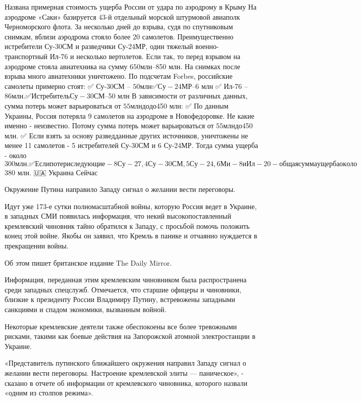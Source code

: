  
 
 
 
 

Названа примерная стоимость ущерба России от удара по аэродрому в Крыму
На аэродроме «Саки» базируется 43-й отдельный морской штурмовой авиаполк Черноморского флота. За несколько дней до взрыва, судя по спутниковым снимкам, вблизи аэродрома стояло более 20 самолетов. Преимущественно истребители Су-30СМ и разведчики Су-24МР, один тяжелый военно-транспортный Ил-76 и несколько вертолетов. Если так, то перед взрывом на аэродроме стояла авиатехника на сумму $650 млн – $850 млн.
На снимках после взрыва много авиатехники уничтожено. По подсчетам Forbes, российские самолеты примерно стоят:
✅ Су-30СМ – $50 млн
✅ Су-24МР – $6 млн
✅ Ил-76 – $86 млн.
✅ Истребитель Су-30СМ – $50 млн
В зависимости от различных данных, сумма потерь может варьироваться от $55 млн до до $450 млн:
✅ По данным Украины, Россия потеряла 9 самолетов на аэродроме в Новофедоровке. Не какие именно - неизвестно. Потому сумма потерь может варьироваться от $55 млн до $450 млн.
✅ Если взять за основу разведданные других источников, уничтожены не менее 11 самолетов - 5 истребителей Су-30СМ и 6 Су-24МР. Тогда сумма ущерба - около $300 млн.
✅ Если потери следующие - 8 Су-27, 4 Су-30СМ, 5 Су-24, 6 Ми-8 и Ил-20 - общая сумма ущерба около $380 млн.
🇺🇦 Украина Сейчас


Окружение Путина направило Западу сигнал о желании вести переговоры.

Идут уже 173-е сутки полномасштабной войны, которую Россия ведет в Украине, в западных СМИ появилась информация, что некий высокопоставленный кремлевский чиновник тайно обратился к Западу, с просьбой помочь положить конец этой войне. Якобы он заявил, что Кремль в панике и отчаянно нуждается в прекращении войны.

Об этом пишет британское издание The Daily Mirror.

Информация, переданная этим кремлевским чиновником была распространена среди западных спецслужб. Отмечается, что старшие офицеры и чиновники, близкие к президенту России Владимиру Путину, встревожены западными санкциями и спадом экономики, вызванным войной.

Некоторые кремлевские деятели также обеспокоены все более тревожными рисками, такими как боевые действия на Запорожской атомной электростанции в Украине.

«Представитель путинского ближайшего окружения направил Западу сигнал о желании вести переговоры. Настроение кремлевской элиты — паническое», - сказано в отчете об информации от кремлевского чиновника, которого назвали «одним из столпов режима».
